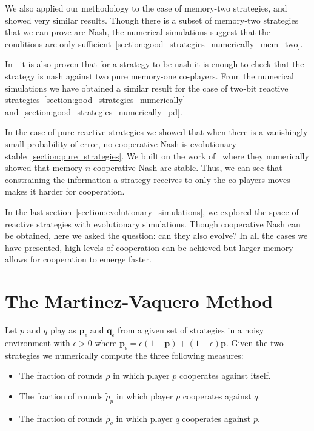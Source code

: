 \documentclass{article}
\theoremstyle{definition}
\begin{document}
We also applied our methodology to the case of memory-two strategies, and showed
very similar results. Though there is a subset of memory-two strategies that we
can prove are Nash, the numerical simulations suggest that the conditions are
only sufficient~\ref{section:good_strategies_numerically_mem_two}.

In~\citep{akin:EGADS:2016} it is also proven that for a strategy to be nash it
is enough to check that the strategy is nash against two pure memory-one
co-players. From the numerical simulations we have obtained a similar result for
the case of two-bit reactive
strategies~\ref{section:good_strategies_numerically}
and~\ref{section:good_strategies_numerically_pd}.

In the case of pure reactive strategies we showed that when there is a
vanishingly small probability of error, no cooperative Nash is evolutionary
stable~\ref{section:pure_strategies}. We
built on the work of~\citep{hilbe:PNAS:2017} where they numerically showed that
memory-\(n\) cooperative Nash are stable. Thus, we can see that constraining
the information a strategy receives to only the co-players moves makes it harder
for cooperation.

In the last section~\ref{section:evolutionary_simulations}, we explored the
space of reactive strategies with evolutionary simulations. Though cooperative
Nash can be obtained, here we asked the question: can they also evolve? In all
the cases we have presented, high levels of cooperation can be achieved but
larger memory allows for cooperation to emerge faster.


\appendix

\section{The Martinez-Vaquero Method}\label{section:matrinez_vaquero_method}

Let \(p\) and \(q\) play as \(\mathbf{p}_{\epsilon}\) and
\(\mathbf{q}_{\epsilon}\) from a given set of strategies in a noisy environment
with \(\epsilon > 0\) where \(\mathbf{p}_{\epsilon} = \epsilon(1 - \mathbf{p}) +
(1 - \epsilon)\mathbf{p} \). Given the two strategies we numerically compute
the three following measures:


\begin{itemize}
  \item The fraction of rounds \(\rho\) in which player \(p\) cooperates against itself.
  \item The fraction of rounds \(\tilde{\rho}_p\) in which player \(p\) cooperates against \(q\).
  \item The fraction of rounds \(\tilde{\rho}_q\) in which player \(q\) cooperates against \(p\).
\end{itemize}
\end{document}
